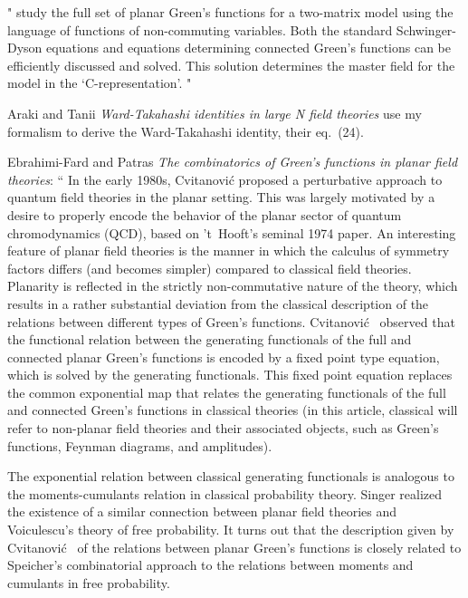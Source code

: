 \begin{description}
"
study the full set of planar Green's functions for a two-matrix model 
using the language of functions of non-commuting variables. Both the 
standard Schwinger-Dyson equations and equations determining connected 
Green's functions can be efficiently discussed and solved. This solution 
determines the master field for the model in the `C-representation'. 
"

Araki and Tanii
{\em {Ward-Takahashi} identities in large {N} field theories}
use my formalism to derive the {Ward-Takahashi} identity,
their eq.~(24).

Ebrahimi-Fard and Patras
{\em The combinatorics of {Green}'s functions in planar field theories}:
`` In the early 1980s, Cvitanovi\'c \etal{} proposed
a perturbative approach to quantum field theories in the planar setting.
This was largely motivated by a desire to properly encode the behavior of
the planar sector of quantum chromodynamics (QCD), based on 't~Hooft's
seminal 1974 paper. An interesting feature of planar
field theories is the manner in which the calculus of symmetry factors
differs (and becomes simpler) compared to classical field theories.
Planarity is reflected in the strictly non-commutative nature of the
theory, which results in a rather substantial deviation from the
classical description of the relations between different types of Green's
functions. Cvitanovi\'c \etal\ observed that the functional relation
between the generating functionals of the full and connected planar
Green's functions is encoded by a fixed point type equation, which is
solved by the generating functionals. This fixed point equation replaces
the common exponential map that relates the generating functionals of the
full and connected Green's functions in classical theories (in this
article, classical will refer to non-planar field theories and their
associated objects, such as Green's functions, Feynman diagrams, and
amplitudes).

The exponential relation between classical generating functionals is
analogous to the moments-cumulants relation in classical probability
theory. Singer realized the existence of a similar connection
between planar field theories and Voiculescu's theory of free
probability. It turns out that the description given by
Cvitanovi\'c \etal\  of the relations between planar Green's functions is
closely related to Speicher's combinatorial approach to the relations
between moments and cumulants in free probability.


\end{description}
